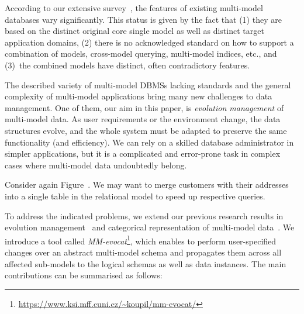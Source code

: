 According to our extensive survey~\citep{CSUR-Jiaheng}, the features of existing multi-model databases vary significantly. This status is given by the fact that (1) they are based on the distinct original core single model as well as distinct target application domains, (2) there is no acknowledged standard on how to support a combination of models, cross-model querying, multi-model indices, etc., and (3)~the combined models have distinct, often contradictory features. 

The described variety of multi-model DBMSs lacking standards and the general complexity of multi-model applications bring many new challenges to data management. 
One of them, our aim in this paper, is \textit{evolution management} of multi-model data. As user requirements or the environment change, the data structures evolve, and the whole system must be adapted to preserve the same functionality (and efficiency). We can rely on a skilled database administrator in simpler applications, but it is a complicated and error-prone task in complex cases where multi-model data undoubtedly belong. 

\begin{example}
Consider again Figure~. We may want to merge customers with their addresses into a single table in the relational model to speed up respective queries. %
\end{example}

To address the indicated problems, we extend our previous research results in evolution management~\citep{Necasky:2012:ECM:2148237.2148273,DBLP:journals/dke/HolubovaVS21} and categorical representation of multi-model data~\citep{mm_cat_journal}. We introduce a tool called \textit{MM-evocat}\footnote{\url{https://www.ksi.mff.cuni.cz/~koupil/mm-evocat/}}, which enables to perform user-specified changes over an abstract multi-model schema and propagates them across all affected sub-models to the logical schemas as well as data instances. 
The main contributions can be summarised as follows:

